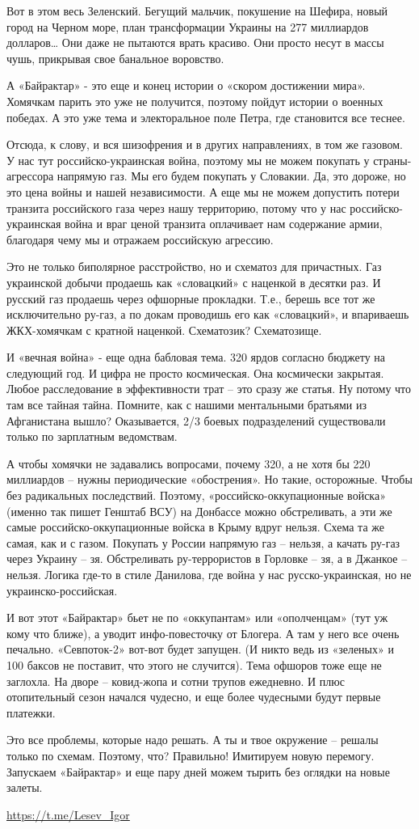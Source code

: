Вот в этом весь Зеленский. Бегущий мальчик, покушение на Шефира, новый город на
Черном море, план трансформации Украины на 277 миллиардов долларов… Они даже не
пытаются врать красиво. Они просто несут в массы чушь, прикрывая свое банальное
воровство.

А «Байрактар» - это еще и конец истории о «скором достижении мира». Хомячкам
парить это уже не получится, поэтому пойдут истории о военных победах. А это
уже тема и электоральное поле Петра, где становится все теснее.

Отсюда, к слову, и вся шизофрения и в других направлениях, в том же газовом. У
нас тут российско-украинская война, поэтому мы не можем покупать у
страны-агрессора напрямую газ. Мы его будем покупать у Словакии. Да, это
дороже, но это цена войны и нашей независимости. А еще мы не можем допустить
потери транзита российского газа через нашу территорию, потому что у нас
российско-украинская война и враг ценой транзита оплачивает нам содержание
армии, благодаря чему мы и отражаем российскую агрессию.

Это не только биполярное расстройство, но и схематоз для причастных. Газ
украинской добычи продаешь как «словацкий» с наценкой в десятки раз. И русский
газ продаешь через офшорные прокладки. Т.е., берешь все тот же исключительно
ру-газ, а по докам проводишь его как «словацкий», и впариваешь ЖКХ-хомячкам с
кратной наценкой. Схематозик? Схематозище.

И «вечная война» - еще одна бабловая тема. 320 ярдов согласно бюджету на
следующий год. И цифра не просто космическая. Она космически закрытая. Любое
расследование в эффективности трат – это сразу же статья. Ну потому что там все
тайная тайна. Помните, как с нашими ментальными братьями из Афганистана вышло?
Оказывается, 2/3 боевых подразделений существовали только по зарплатным
ведомствам.

А чтобы хомячки не задавались вопросами, почему 320, а не хотя бы 220
миллиардов – нужны периодические «обострения». Но такие, осторожные. Чтобы без
радикальных последствий. Поэтому, «российско-оккупационные войска» (именно так
пишет Генштаб ВСУ) на Донбассе можно обстреливать, а эти же самые
российско-оккупационные войска в Крыму вдруг нельзя. Схема та же самая, как и с
газом. Покупать у России напрямую газ – нельзя, а качать ру-газ через Украину –
зя. Обстреливать ру-террористов в Горловке – зя, а в Джанкое – нельзя. Логика
где-то в стиле Данилова, где война у нас русско-украинская, но не
украинско-российская.

И вот этот «Байрактар» бьет не по «оккупантам» или «ополченцам» (тут уж кому
что ближе), а уводит инфо-повесточку от Блогера. А там у него все очень
печально. «Севпоток-2» вот-вот будет запущен. (И никто ведь из «зеленых» и 100
баксов не поставит, что этого не случится). Тема офшоров тоже еще не заглохла.
На дворе – ковид-жопа и сотни трупов ежедневно. И плюс отопительный сезон
начался чудесно, и еще более чудесными будут первые платежки.

Это все проблемы, которые надо решать. А ты и твое окружение – решалы только по
схемам. Поэтому, что? Правильно! Имитируем новую перемогу. Запускаем
«Байрактар» и еще пару дней можем тырить без оглядки на новые залеты.

\url{https://t.me/Lesev_Igor}
